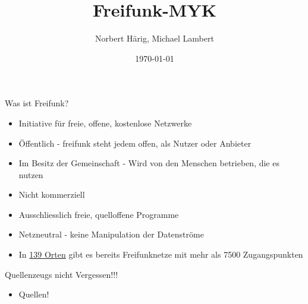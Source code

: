 \documentclass[c]{beamer}
\title{Freifunk-MYK}
\author{Norbert Härig, Michael Lambert}
\date{\today}
\begin{document}
\maketitle

\begin{frame}{Was ist Freifunk?}
	\begin{itemize}
		\item Initiative für freie, offene, kostenlose Netzwerke
		\item Öffentlich - freifunk steht jedem offen, als Nutzer oder Anbieter
		\item Im Besitz der Gemeinschaft - Wird von den Menschen betrieben, die es nutzen
		\item Nicht kommerziell
		\item Ausschliesslich freie, quelloffene Programme
		\item Netzneutral - keine Manipulation der Datenströme
		\item In  \href{http://freifunk.net/wie-mache-ich-mit/community-finden/}{139 Orten} gibt es bereits Freifunknetze mit mehr als 7500 Zugangspunkten
	\end{itemize}
\end{frame}

\begin{frame}{Quellenzeugs nicht Vergessen!!!}
\begin{itemize}
		\item Quellen!
\end{itemize}
\end{frame}
\end{document}
